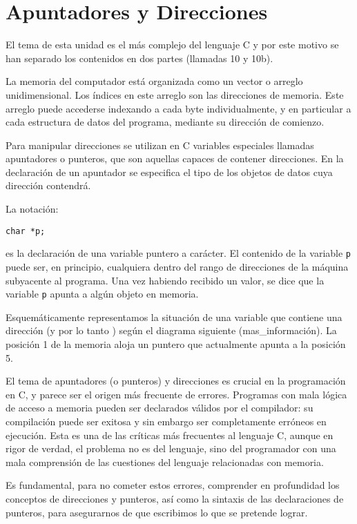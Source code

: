 


\chapter{Apuntadores y Direcciones}
\label{sec:tc-direcciones}
El tema de esta unidad es el más complejo del lenguaje C y por este motivo se
han separado los contenidos en dos partes (llamadas 10 y 10b).

La memoria del computador está organizada como un vector o arreglo
unidimensional. Los índices en este arreglo son las direcciones de memoria.
Este arreglo puede accederse indexando a cada byte individualmente, y en
particular a cada estructura de datos del programa, mediante su dirección de
comienzo.

Para manipular direcciones se utilizan en C variables especiales llamadas
apuntadores o punteros, que son aquellas capaces de contener direcciones. En la
declaración de un apuntador se especifica el tipo de los objetos de datos cuya
dirección contendrá.

La notación:
\begin{lstlisting}
char *p;
\end{lstlisting}
es la declaración de una variable puntero a carácter. El contenido de la
variable \lstinline{p} puede ser, en principio, cualquiera dentro del rango de direcciones
de la máquina subyacente al programa. Una vez habiendo recibido un valor, se
dice que la variable \lstinline{p} apunta a algún objeto en memoria.

Esquemáticamente representamos la situación de una variable que contiene una
dirección (y por lo tanto ) según el diagrama siguiente
(mas\_información). La posición 1 de la memoria aloja un puntero que actualmente
apunta a la posición 5.


El tema de apuntadores (o punteros) y direcciones es crucial en la programación
en C, y parece ser el origen más frecuente de errores. Programas con mala
lógica de acceso a memoria pueden ser declarados válidos por el compilador: su
compilación puede ser exitosa y sin embargo ser completamente erróneos en
ejecución. Esta es una de las críticas más frecuentes al lenguaje C, aunque en
rigor de verdad, el problema no es del lenguaje, sino del programador con una
mala comprensión de las cuestiones del lenguaje relacionadas con memoria.

Es fundamental, para no cometer estos errores, comprender en profundidad los
conceptos de direcciones y punteros, así como la sintaxis de las
declaraciones de punteros, para asegurarnos de que escribimos lo que se pretende
lograr.

